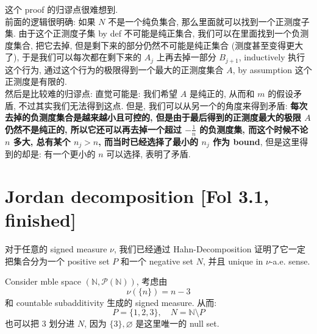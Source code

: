 \documentclass[lang=cn,11pt]{elegantbook}
\begin{document}
\begin{remark}
   这个 proof 的归谬点很难想到.\\
   前面的逻辑很明确: 如果 $N$ 不是一个纯负集合, 那么里面就可以找到一个正测度子集. 由于这个正测度子集 by def 不可能是纯正集合,  我们可以在里面找到一个负测度集合, 把它去掉, 但是剩下来的部分仍然不可能是纯正集合 (测度甚至变得更大了), 于是我们可以每次都在剩下来的 $A_{j}$ 上再去掉一部分 $B_{j+1}$, inductively 执行这个行为, 通过这个行为的极限得到一个最大的正测度集合 $A$, by assumption 这个正测度是有限的.\\
  然后是比较难的归谬点: 直觉可能是: 我们希望 $A$ 是纯正的, 从而和 $m$ 的假设矛盾, 不过其实我们无法得到这点.   但是, 我们可以从另一个的角度来得到矛盾: \textbf{每次去掉的负测度集合是越来越小且可控的, 但是由于最后得到的正测度最大的极限 $A$ 仍然不是纯正的, 所以它还可以再去掉一个超过 $-\frac{1}{n}$ 的负测度集, 而这个时候不论 $n$ 多大, 总有某个 $n_j > n$, 而当时已经选择了最小的 $n_j$ 作为 bound}, 但是这里得到的却是: 有一个更小的 $n$ 可以选择, 表明了矛盾.
\end{remark}



\chapter{Jordan decomposition [Fol 3.1, finished]}

对于任意的 signed measure $\nu$, 我们已经通过 Hahn-Decomposition 证明了它一定把集合分为一个 positive set $P$ 和一个 negative set $N$, 并且 unique in $\nu$-a.e. sense.\\
\begin{example}
Consider mble space $(\mathbb{N},\mathcal{P}(\mathbb{N}))$, 考虑由\[
\nu (\{n\}) = n - 3
\]
和 countable subadditivity 生成的 signed measure. 从而: \[
P = \{1,2,3 \}, \quad N = \mathbb{N}\setminus P
\]
也可以把 $3$ 划分进 $N$, 因为 $\{3 \},\varnothing$ 是这里唯一的 null set.
\end{example}
\end{document}
